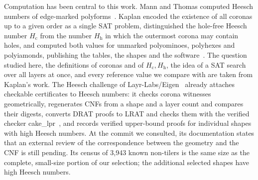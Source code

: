 \documentclass[10pt,a4paper]{article}
\theoremstyle{definition}
\theoremstyle{remark}
\newcommand{\Hc}{H_{\mathrm c}}
\newcommand{\Hh}{H_{\mathrm h}}
\begin{document}
Computation has been central to this work. Mann and Thomas computed
Heesch numbers of edge-marked polyforms~\cite{MannThomas}. Kaplan
\cite{Kaplan} encoded the existence of all coronas up to a given order as
a single SAT problem, distinguished the hole-free Heesch number $\Hc$ from
the number $\Hh$ in which the outermost corona may contain holes, and
computed both values for unmarked polyominoes, polyhexes and polyiamonds,
publishing the tables, the shapes and the software~\cite{heeschsat}. The
question studied here, the definitions of coronas and of $\Hc,\Hh$, the
idea of a SAT search over all layers at once, and every reference value
we compare with are taken from Kaplan's work. The Heesch challenge of
Layr-Labs/Eigen~\cite{Layr} already attaches checkable certificates to
Heesch numbers: it checks corona witnesses geometrically, regenerates CNFs
from a shape and a layer count and compares their digests, converts DRAT
proofs to LRAT and checks them with the verified checker
cake\_lpr~\cite{cakelpr}, and records verified upper-bound proofs for
individual shapes with high Heesch numbers. At the commit we consulted,
its documentation states that an external review of the correspondence
between the geometry and the CNF is still pending. Its census of 3,943
known non-tilers is the same size as the complete, small-size portion of
our selection; the additional selected shapes have high Heesch numbers.
\end{document}
